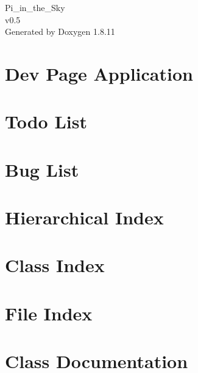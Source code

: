 \documentclass[twoside]{book}
\newcommand{\+}{\discretionary{\mbox{\scriptsize$\hookleftarrow$}}{}{}}
\newcommand{\clearemptydoublepage}{%
  \newpage{\pagestyle{empty}\cleardoublepage}%
}
\begin{document}
\hypersetup{pageanchor=false,
             bookmarksnumbered=true,
             pdfencoding=unicode
            }
\begin{titlepage}
\vspace*{7cm}
\begin{center}%
{\Large Pi\+\_\+in\+\_\+the\+\_\+\+Sky \\[1ex]\large v0.\+5 }\\
\vspace*{1cm}
{\large Generated by Doxygen 1.8.11}\\
\end{center}
\end{titlepage}
\clearemptydoublepage
\tableofcontents
\clearemptydoublepage
{}
\hypersetup{pageanchor=true}

\chapter{Dev Page Application}
\label{index}\hypertarget{index}{}
\chapter{Todo List}
\label{todo}
\hypertarget{todo}{}

\chapter{Bug List}
\label{bug}
\hypertarget{bug}{}

\chapter{Hierarchical Index}

\chapter{Class Index}

\chapter{File Index}

\chapter{Class Documentation}






























\end{document}
